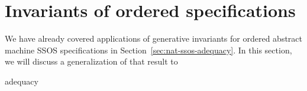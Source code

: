 






\section{Invariants of ordered specifications}
\label{sec:gen-order}

We have already covered applications of generative invariants for
ordered abstract machine SSOS specifications in
Section~\ref{sec:nat-ssos-adequacy}. In this section, we will
discuss a generalization of that result to 

adequacy


